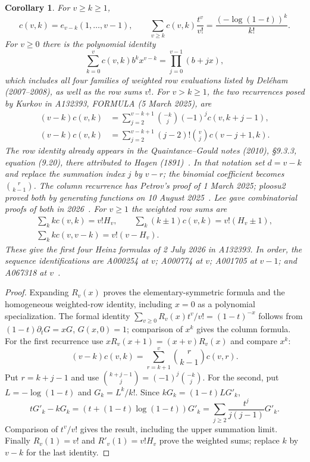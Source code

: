 \documentclass[11pt]{article}
\newtheorem{corollary}[theorem]{Corollary}
\begin{document}
\begin{corollary}\label{cor:classical}
For $v\geq k\geq1$,
\[
c(v,k)=e_{v-k}(1,\ldots,v-1),\qquad
\sum_{v\geq k}c(v,k)\frac{t^v}{v!}=\frac{(-\log(1-t))^k}{k!}.
\]
For $v\geq0$ there is the polynomial identity
\[
\sum_{k=0}^v c(v,k)b^k x^{v-k}=\prod_{j=0}^{v-1}(b+jx),
\]
which includes all four families of weighted row evaluations listed by
Del\'eham (2007--2008), as well as the row sums $v!$.
For $v>k\geq1$, the two recurrences posed by Kurkov in A132393,
FORMULA (5 March 2025), are
\begin{align*}
(v-k)c(v,k)&=\sum_{j=2}^{v-k+1}\binom{-k}{j}(-1)^j c(v,k+j-1),\\
(v-k)c(v,k)&=\sum_{j=2}^{v-k+1}(j-2)!\binom vj c(v-j+1,k).
\end{align*}
The row identity already appears in the Quaintance--Gould notes (2010),
\S9.3.3, equation (9.20), there attributed to Hagen (1891)~\cite{qg}.
In that notation set $d=v-k$ and replace the summation index $j$ by $v-r$;
the binomial coefficient becomes $\binom r{k-1}$.
The column recurrence has Petrov's proof of 1 March 2025;
ploosu2 proved both by generating functions on 10 August 2025~\cite{recurrences}.
Lee gave combinatorial proofs of both in 2026~\cite[Theorems 11 and 14]{lee}.
For $v\geq1$ the weighted row sums are
\begin{gather*}
\sum_k k c(v,k)=v!H_v,\qquad
\sum_k(k\mathbin{\pm}1)c(v,k)=v!(H_v\mathbin{\pm}1),\\
\sum_k k c(v,v-k)=v!(v-H_v).
\end{gather*}
These give the first four Heinz formulas of 2 July 2026 in A132393.
In order, the sequence identifications are A000254 at $v$;
A000774 at $v$; A001705 at $v-1$; and A067318 at $v$~\cite{weighted}.
\end{corollary}
\begin{proof}
Expanding $R_v(x)$ proves the elementary-symmetric formula and the homogeneous
weighted-row identity, including $x=0$ as a polynomial specialization.
The formal identity $\sum_{v\geq0}R_v(x)t^v/v!=(1-t)^{-x}$ follows from
$(1-t)\partial_t G=xG$, $G(x,0)=1$; comparison of $x^k$ gives the column formula.
For the first recurrence use $xR_v(x+1)=(x+v)R_v(x)$ and compare $x^k$:
\[
(v-k)c(v,k)=\sum_{r=k+1}^v\binom r{k-1}c(v,r).
\]
Put $r=k+j-1$ and use $\binom{k+j-1}j=(-1)^j\binom{-k}j$.
For the second, put $L=-\log(1-t)$ and $G_k=L^k/k!$.
Since $kG_k=(1-t)L G'_k$,
\[
tG'_k-kG_k=(t+(1-t)\log(1-t))G'_k
 =\sum_{j\geq2}\frac{t^j}{j(j-1)}G'_k.
\]
Comparison of $t^v/v!$ gives the result, including the upper summation limit.
Finally $R_v(1)=v!$ and $R'_v(1)=v!H_v$ prove the weighted sums;
replace $k$ by $v-k$ for the last identity.
\end{proof}
\end{document}
